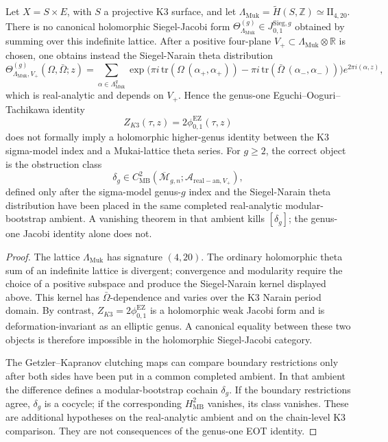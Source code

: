\begin{proposition}
\label{prop:cy-c-i2-higher-genus-reduction}
Let \(X=S\times E\), with \(S\) a projective K3 surface, and let
\(\Lambda_{\mathrm{Muk}}=\widetilde H(S,\mathbb Z)\simeq \mathrm{II}_{4,20}\).
There is no canonical holomorphic Siegel-Jacobi form
\(\Theta_{\Lambda_{\mathrm{Muk}}}^{(g)}\in J^{\mathrm{Sieg},g}_{0,1}\)
obtained by summing over this indefinite lattice.  After a positive
four-plane \(V_+\subset\Lambda_{\mathrm{Muk}}\otimes\mathbb R\) is chosen,
one obtains instead the Siegel-Narain theta distribution
\[
 \Theta_{\Lambda_{\mathrm{Muk}},V_+}^{(g)}(\Omega,\bar\Omega;z)
 =
 \sum_{\alpha\in\Lambda_{\mathrm{Muk}}^g}
 \exp\!\bigl(\pi i\,\mathrm{tr}(\Omega\,(\alpha_+,\alpha_+))
           -\pi i\,\mathrm{tr}(\bar\Omega\,(\alpha_-,\alpha_-))\bigr)
 e^{2\pi i(\alpha,z)} ,
\]
which is real-analytic and depends on \(V_+\).  Hence the genus-one
Eguchi--Ooguri--Tachikawa identity
\[
 Z_{K3}(\tau,z)=2\phi_{0,1}^{\mathrm{EZ}}(\tau,z)
\]
does not formally imply a holomorphic higher-genus identity between the
K3 sigma-model index and a Mukai-lattice theta series.  For \(g\geq2\),
the correct object is the obstruction class
\[
 \delta_g\in
 C^2_{\mathrm{MB}}(\overline{\mathcal M}_{g,n};
 \mathcal A_{\mathrm{real-an},V_+}),
\]
defined only after the sigma-model genus-\(g\) index and the
Siegel-Narain theta distribution have been placed in the same completed
real-analytic modular-bootstrap ambient.  A vanishing theorem in that
ambient kills \([\delta_g]\); the genus-one Jacobi identity alone does
not.
\end{proposition}

\begin{proof}
The lattice \(\Lambda_{\mathrm{Muk}}\) has signature \((4,20)\).  The
ordinary holomorphic theta sum of an indefinite lattice is divergent;
convergence and modularity require the choice of a positive subspace
and produce the Siegel-Narain kernel displayed above.  This kernel has
\(\bar\Omega\)-dependence and varies over the K3 Narain period domain.
By contrast, \(Z_{K3}=2\phi_{0,1}^{\mathrm{EZ}}\) is a holomorphic weak
Jacobi form and is deformation-invariant as an elliptic genus.  A
canonical equality between these two objects is therefore impossible in
the holomorphic Siegel-Jacobi category.

The Getzler--Kapranov clutching maps can compare boundary restrictions
only after both sides have been put in a common completed ambient.  In
that ambient the difference defines a modular-bootstrap cochain
\(\delta_g\).  If the boundary restrictions agree, \(\delta_g\) is a
cocycle; if the corresponding \(H^2_{\mathrm{MB}}\) vanishes, its class
vanishes.  These are additional hypotheses on the real-analytic
ambient and on the chain-level K3 comparison.  They are not consequences
of the genus-one EOT identity.
\end{proof}

